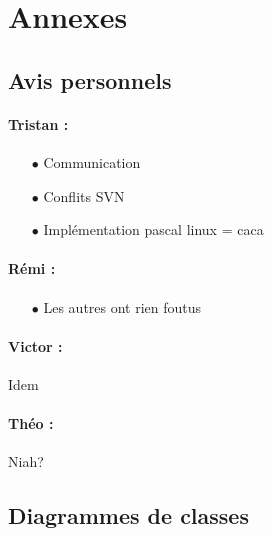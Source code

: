 \section{Annexes}
\subsection{Avis personnels}
\paragraph{Tristan :}
\begin{itemize}
\item[$\bullet$]Communication
\item[$\bullet$]Conflits SVN
\item[$\bullet$]Implémentation pascal linux = caca
\end{itemize}
\paragraph{Rémi :}
\begin{itemize}
\item[$\bullet$] Les autres ont rien foutus
\end{itemize}
\paragraph{Victor :}

Idem
\paragraph{Théo :}

Niah?
\newpage
\subsection{Diagrammes de classes}

